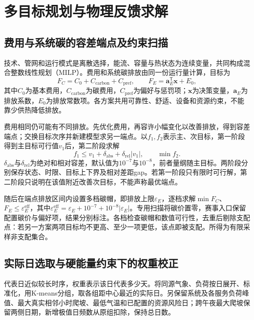 \section{多目标规划与物理反馈求解}

\subsection{费用与系统碳的容差端点及约束扫描}

技术、管网和运行模式是离散选择，能流、容量与热状态为连续变量，共同构成混合整数线性规划（MILP）。费用和系统碳排放由同一份运行量计算，目标为
\begin{equation}
F_C=C_0+C_{\mathrm{carbon}}+C_{\mathrm{pref}},\qquad F_E=\boldsymbol a_E^\mathsf T\boldsymbol x+E_0,
\label{eq:scoring-objectives}
\end{equation}
其中$C_0$为基本费用，$C_{\mathrm{carbon}}$为碳费用，$C_{\mathrm{pref}}$为偏好与惩罚项；$\boldsymbol x$为决策变量，$\boldsymbol a_E$为排放系数，$E_0$为排放常数项。各方案共用可靠性、舒适、设备和资源约束，不能靠少供热降低排放。

费用相同仍可能有不同排放。先优化费用，再容许小幅变化以改善排放，得到容差端点；交换目标次序并新建模型求另一端点。以$f_1,f_2$表示主、次目标，第一阶段得到主目标可行值$v_1$后，第二阶段求解
\begin{equation}
f_1\leq v_1+\delta_{\mathrm{abs}}+\delta_{\mathrm{rel}}|v_1|,
\qquad\min f_2.
\label{eq:scoring-endpoint}
\end{equation}
$\delta_{\mathrm{abs}}$与$\delta_{\mathrm{rel}}$为绝对和相对容差，默认值为$10^{-7}$与$10^{-8}$，前者量纲随主目标。两阶段分别保存状态、时限、目标上下界及相对差距gap。若第一阶段只有限时可行解，第二阶段只说明在该值附近改善次目标，不能声称最优端点。

随后在端点排放区间内设置多档碳帽，即排放上限$\varepsilon_E$，逐档求解$\min F_C$、$F_E\leq\varepsilon_E^{\mathrm{eff}}$，其中$\varepsilon_E^{\mathrm{eff}}=\varepsilon_E+10^{-7}+10^{-8}|\varepsilon_E|$。专用扫描将碳价置零，赛事入口保留配置碳价与偏好项，结果分别标注。各档检查碳帽和数值可行性，去重后剔除支配点：若另一方案两项目标均不更高、至少一项更低，该点即被支配。所得为有限采样非支配集合。

\subsection{实际日选取与硬能量约束下的权重校正}

代表日近似较长时序，权重表示该日代表多少天。将同源气象、负荷按日展开、标准化，用K-means分组，取各组距中心最近的实际日。另保留系统及各服务负荷峰值、最大真实相邻小时爬坡、最低气温和已配置的资源风险日；跨午夜最大爬坡保留两侧日期，新增极值日频数从原组扣除，保持总日数。


